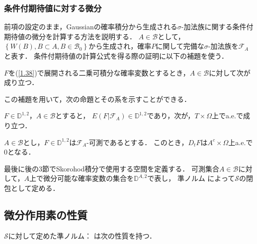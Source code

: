 \subsubsection{条件付期待値に対する微分}
前項の設定のまま，Gaussianの確率積分から生成される$\sigma$-加法族に関する条件付期待値の微分を計算する方法を説明する．
$A\in\mathcal{B}$として，$\left\{W(B),B\subset A,B\in\mathcal{B}_0\right\}$から生成され，確率$P$に関して完備な$\sigma$-加法族を$\mathcal{F}_A$と表す．
条件付期待値の計算公式を得る際の証明に以下の補題を使う．
\begin{lemma}\label{lem1.2.5}%
$F$を(\ref{1.38})で展開される二乗可積分な確率変数とするとき，$A\in\mathcal{B}$に対して次が成り立つ．
\end{lemma}
この補題を用いて，次の命題とその系を示すことができる．
\begin{proposition}\label{prop1.2.8}%
$F\in\mathbb{D}^{1,2}$，$A\in\mathcal{B}$とすると，
$E\left(F|\mathcal{F}_A\right)\in\mathbb{D}^{1,2}$であり，次が，$T\times\Omega$上でa.e.で成り立つ．
\end{proposition}
\begin{corollary}\label{cor1.2.1}
$A\in\mathcal{B}$とし，$F\in\mathbb{D}^{1,2}$は$\mathcal{F}_A$-可測であるとする．
このとき，$D_tF$は$A^c\times\Omega$上a.e.で$0$となる．
\end{corollary}

最後に後の3節でSkorohod積分で使用する空間を定義する．
可測集合$A\in\mathcal{B}$に対して，$A$上で微分可能な確率変数の集合を$\mathbb{D}^{A,2}$で表し，
準ノルム
によって$\mathcal{S}$の閉包として定める．

\subsection{微分作用素の性質}
$\mathcal{S}$に対して定めた準ノルム：
は次の性質を持つ．

